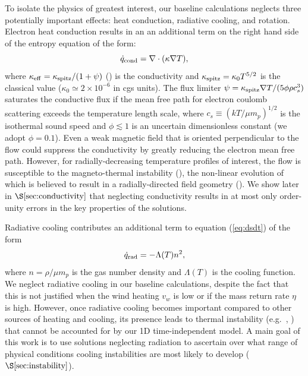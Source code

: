 \documentclass[usenatbib,fleqn]{mn2e}
\newcommand{\vwO}{v_{w}}
\begin{document}
To isolate the physics of greatest interest, our baseline calculations
neglects three potentially important effects: heat conduction,
radiative cooling, and rotation.  Electron heat conduction results in
an an additional term on the right hand side of the entropy equation
of the form:
\begin{equation}
\dot{q}_{\rm cond} = \nabla\cdot(\kappa \nabla T),
\label{eq:qdotcond}
 \end{equation}
 where $\kappa_{\rm eff}=\kappa_{\rm spitz}/(1+\psi)$
 (\citealt{DaltonBalbus:1993a}) is the conductivity and $\kappa_{\rm
   spitz} = \kappa_0 T^{5/2}$ is the classical \citet{Spitzer62} value
 ($\kappa_0\simeq 2\times 10^{-6}$ in cgs units).  The flux limiter
 $\psi = \kappa_{\rm spitz} \nabla T/(5\phi \rho c_s^3)$ saturates the
 conductive flux if the mean free path for electron coulomb scattering
 exceeds the temperature length scale, where $c_s \equiv (kT/\mu
 m_p)^{1/2}$ is the isothermal sound speed and $\phi \lesssim 1$ is an
 uncertain dimensionless constant (we adopt $\phi = 0.1$).  Even a
 weak magnetic field that is oriented perpendicular to the flow could
 suppress the conductivity by greatly reducing the electron mean free
 path.  However, for radially-decreasing temperature profiles of
 interest, the flow is susceptible to the magneto-thermal instability
 (\citealt{Balbus01}), the non-linear evolution of which is believed
 to result in a radially-directed field geometry
 (\citealt{Parrish&Stone07}).  We show later in
 $\S\ref{sec:conductivity}$ that neglecting conductivity results in at
 most only order-unity errors in the key properties of the solutions.

Radiative cooling contributes an additional term to equation (\ref{eq:dsdt}) of the form
\begin{equation}
\dot{q}_{\rm rad} = -\Lambda(T)n^{2},
\label{eq:qdot_rad}
\end{equation}
where $n = \rho/\mu m_p$ is the gas number density and $\Lambda(T)$ is
the cooling function.  We neglect radiative cooling in our baseline
calculations, despite the fact that this is not justified when the
wind heating $\vwO$ is low or if the mass return rate $\eta$ is high.
However, once radiative cooling becomes important compared to other
sources of heating and cooling, its presence leads to thermal
instability (e.g.~\citealt{McCourt+12}, \citealt{Li&Bryan14a}) that cannot be accounted for
by our 1D time-independent model.  A main goal of this work is to use
solutions neglecting radiation to ascertain over what range of
physical conditions cooling instabilities are most likely to develop
($\S\ref{sec:instability}$).
\end{document}
